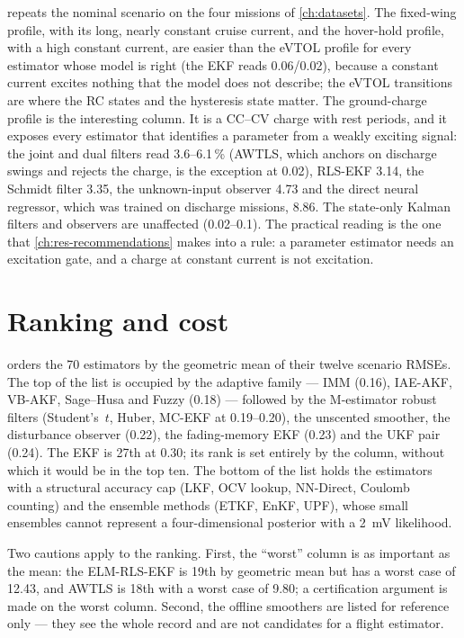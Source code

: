  repeats the nominal scenario on the four missions of \cref{ch:datasets}.
The fixed-wing profile, with its long, nearly constant cruise current, and the hover-hold
profile, with a high constant current, are easier than the eVTOL profile for every estimator
whose model is right (the EKF reads \num{0.06}/\num{0.02}), because a constant current excites
nothing that the model does not describe; the eVTOL transitions are where the RC states and
the hysteresis state matter. The ground-charge profile is the interesting column. It is a
CC--CV charge with rest periods, and it exposes every estimator that identifies a parameter
from a weakly exciting signal: the joint and dual filters read \num{3.6}--\num{6.1}\,\% (AWTLS, which
anchors on discharge swings and rejects the charge, is the exception at \num{0.02}),
RLS-EKF \num{3.14}, the Schmidt filter \num{3.35}, the unknown-input observer \num{4.73} and the
direct neural regressor, which was trained on discharge missions, \num{8.86}. The state-only
Kalman filters and observers are unaffected (\num{0.02}--\num{0.1}). The practical reading is
the one that \cref{ch:res-recommendations} makes into a rule: a parameter estimator needs an
excitation gate, and a charge at constant current is not excitation.



\section{Ranking and cost}

 orders the 70 estimators by the geometric mean of their twelve scenario
RMSEs. The top of the list is occupied by the adaptive family --- IMM (\num{0.16}), IAE-AKF,
VB-AKF, Sage--Husa and Fuzzy (\num{0.18}) --- followed by the M-estimator robust filters
(Student's~$t$, Huber, MC-EKF at \num{0.19}--\num{0.20}), the unscented smoother, the
disturbance observer (\num{0.22}), the fading-memory EKF (\num{0.23}) and the UKF pair
(\num{0.24}). The EKF is 27th at \num{0.30}; its rank is set entirely by the 
column, without which it would be in the top ten. The bottom of the list holds the estimators
with a structural accuracy cap (LKF, OCV lookup, NN-Direct, Coulomb counting) and the
ensemble methods (ETKF, EnKF, UPF), whose small ensembles cannot represent a
four-dimensional posterior with a \SI{2}{\milli\volt} likelihood.

Two cautions apply to the ranking. First, the ``worst'' column is as important as the mean: the
ELM-RLS-EKF is 19th by geometric mean but has a worst case of \num{12.43}, and AWTLS is 18th
with a worst case of \num{9.80}; a certification argument is made on the worst column.
Second, the offline smoothers are listed for reference only --- they see the whole record and
are not candidates for a flight estimator.

